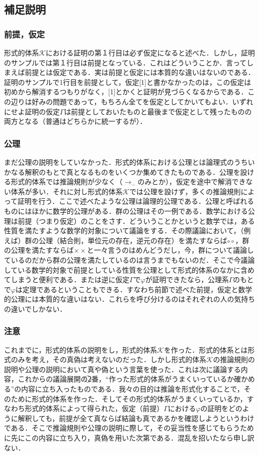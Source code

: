 \documentclass[10pt,b5paper,papersize,dvipdfmx]{jsbook}
\newcommand\maru[1]{\textcircled{\scriptsize{}#1}}
\newcommand\DQ[1]{“#1”}
\begin{document}
\subsection{補足説明}
\subsubsection{前提，仮定}
形式的体系$\mathcal K$における証明の第１行目は必ず仮定になると述べた．しかし，証明のサンプルでは第１行目は前提となっている．これはどういうことか．言ってしまえば前提とは仮定である．実は前提と仮定には本質的な違いはないのである．証明のサンプルで1行目を前提として，仮定[1]と書かなかったのは，この仮定は初めから解消するつもりがなく，[1]とかくと証明が見づらくなるからである．この辺りは好みの問題であって，もちろん全てを仮定としてかいてもよい．いずれにせよ証明の仮定$\Gamma$は前提としておいたものと最後まで仮定として残ったものの両方となる（普通はどちらかに統一するが）．

\subsubsection{公理}
まだ公理の説明をしていなかった．形式的体系における公理とは論理式のうちいかなる解釈のもとで真となるものをいくつか集めてきたものである．公理を設ける形式的体系では推論規則が少なく（$\to_-$のみとか），仮定を途中で解消できない体系が多い．それに対し形式的体系$\mathcal K$では公理を設けず，多くの推論規則によって証明を行う．ここで述べたような公理は論理的公理である．公理と呼ばれるものにはほかに数学的公理がある．群の公理はその一例である．数学における公理は前提（つまり仮定）のことをさす．どういうことかというと数学では，ある性質を満たすような数学的対象について議論をする．その際議論において，（例えば）群の公理（結合則，単位元の存在，逆元の存在）を満たすならば$\circ \circ$，群の公理を満たすならば$\times \times$と一々言うのはめんどうだし，今，群について議論しているのだから群の公理を満たしているのは言うまでもないのだ．そこで今議論している数学的対象で前提としている性質を公理として形式的体系のなかに含めてしまうと便利である．または逆に仮定$\Gamma$で$\varphi$が証明できたなら，公理系$\Gamma$のもとで$\varphi$は定理であるということもできる．すなわち前節で述べた前提，仮定と数学的公理には本質的な違いはない．これらを呼び分けるのはそれぞれの人の気持ちの違いでしかない．

\subsubsection{注意}
これまでに，形式的体系の説明をし，形式的体系$\mathcal K$を作った．形式的体系とは形式のみを考え，その真偽は考えないのだった．しかし$形式的体系\mathcal K$の推論規則の説明や公理の説明において真や偽という言葉を使った．これは次に議論する内容，これからの議論展開の\maru{2}番，\DQ{作った形式的体系がうまくいっているか確かめる}の内容に立ち入ったものである．我々の目的は推論を形式化することで，そのために形式的体系を作った．そしてその形式的体系がうまくいっているか，すなわち形式的体系によって得られた，仮定（前提）$\Gamma$における$\varphi$の証明をどのように解釈しても，前提が全て真ならば結論も真であるかを確認しようというわけである．そこで推論規則や公理の説明に際して，その妥当性を感じてもらうために先にこの内容に立ち入り，真偽を用いた次第である．混乱を招いたなら申し訳ない．
\end{document}
